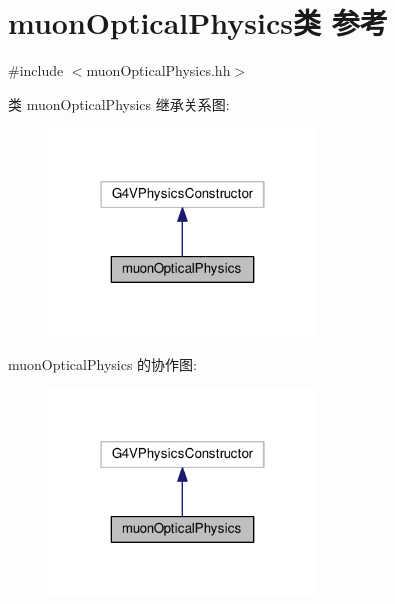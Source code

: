 \hypertarget{classmuonOpticalPhysics}{}\section{muon\+Optical\+Physics类 参考}
\label{classmuonOpticalPhysics}


{\ttfamily \#include $<$muon\+Optical\+Physics.\+hh$>$}



类 muon\+Optical\+Physics 继承关系图\+:\nopagebreak
\begin{figure}[H]
\begin{center}
\leavevmode
\includegraphics[width=202pt]{classmuonOpticalPhysics__inherit__graph}
\end{center}
\end{figure}


muon\+Optical\+Physics 的协作图\+:\nopagebreak
\begin{figure}[H]
\begin{center}
\leavevmode
\includegraphics[width=202pt]{classmuonOpticalPhysics__coll__graph}
\end{center}
\end{figure}
